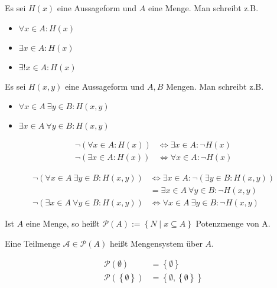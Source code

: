 \begin{example}[Aussageformen]
  Es sei $H(x)$ eine Aussageform und $A$ eine Menge. Man schreibt z.B.
  \begin{itemize}
  \item $\forall x \in A: H(x)$
  \item $\exists x \in A: H(x)$
  \item $\exists! x \in A: H(x)$
  \end{itemize}

  Es sei $H(x, y)$ eine Aussageform und $A, B$ Mengen. Man schreibt z.B.
  \begin{itemize}
  \item $\forall x \in A\: \exists y \in B: H(x, y)$
  \item $\exists x \in A\: \forall y \in B: H(x, y)$
  \end{itemize}
\end{example}

\begin{remark}
  \begin{align*}
    \neg (\forall x \in A: H(x)) &\iff \exists x \in A: \neg H(x) \\
    \neg (\exists x \in A: H(x)) &\iff \forall x \in A: \neg H(x)
  \end{align*}
\end{remark}

\begin{example}
  \begin{align*}
    \neg (\forall x \in A\: \exists y \in B: H(x, y)) &\iff \exists x \in A: \neg (\exists y \in B: H(x, y)) \\
    \, &= \exists x \in A\: \forall y \in B: \neg H(x, y) \\
    \neg (\exists x \in A\: \forall y \in B: H(x, y)) &\iff \forall x \in A\: \exists y \in B: \neg H(x, y)
  \end{align*}
\end{example}

\begin{definition}
  Ist $A$ eine Menge, so heißt $\mathscr{P}(A) := \left\{ N \middle| x \subseteq A \right\}$ Potenzmenge von A.

  Eine Teilmenge $\mathscr{A} \in \mathscr{P}(A)$ heißt Mengensystem über $A$.
\end{definition}
\begin{example}
  \begin{align*}
    \mathscr{P}(\emptyset) &= \left\{ \emptyset \right\} \\
    \mathscr{P}(\left\{ \emptyset \right\}) &= \left\{ \emptyset, \left\{ \emptyset \right\} \right\}
  \end{align*}
\end{example}

